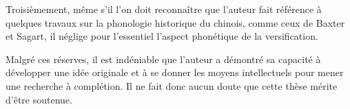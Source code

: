 \documentclass[oldfontcommands,oneside,a4paper,11pt]{article}
\begin{document}
Troisièmement, même s'il l'on doit reconnaître que l'auteur fait référence à quelques travaux sur la phonologie historique du chinois, comme ceux de Baxter et Sagart, il néglige pour l'essentiel l'aspect phonétique de la versification.



Malgré ces réserves, il est indéniable que l'auteur a démontré sa capacité à  développer une idée originale et  à se donner les moyens intellectuels pour mener une recherche à complétion. Il ne fait donc aucun doute que cette thèse mérite d'être soutenue.

%
%
\end{document}
